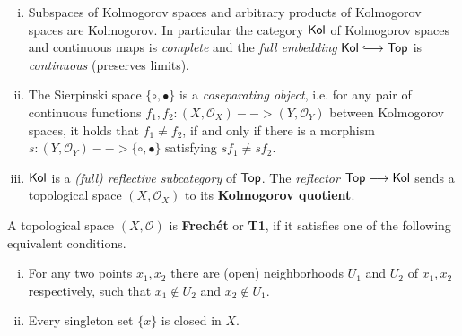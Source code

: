 \begin{lemma}\vspace{-1.5em}
	\begin{enumerate}[(i)]
		\item{
			Subspaces of Kolmogorov spaces and arbitrary products of Kolmogorov spaces are Kolmogorov. In particular the category $\textsf{Kol}$ of Kolmogorov spaces and continuous maps is \textit{complete} and the \textit{full embedding} $\ncat{Kol} \longrightincl \ncat{Top}$ is \textit{continuous} (preserves limits).
		}
		\item{
			The Sierpinski space $\{\circ, \bullet\}$ is a \textit{coseparating object}, i.e. for any pair of continuous functions $f_1,f_2:(X,\mathcal{O}_X) --> (Y,\mathcal{O}_Y)$ between Kolmogorov spaces, it holds that $f_1 \neq f_2$, if and only if there is a morphism $s:(Y,\mathcal{O}_Y) --> \{\circ,\bullet\}$ satisfying $sf_1 \neq sf_2$.
		}
		\item{
			$\textsf{Kol}$ is a \textit{(full) reflective subcategory} of $\textsf{Top}$. The \textit{reflector} $\textsf{Top} --> \textsf{Kol}$ sends a topological space $(X,\mathcal{O}_X)$ to its \textbf{Kolmogorov quotient}.
		}
	\end{enumerate}
\end{lemma}

\begin{definition}
	A topological space $(X, \mathcal{O})$ is \textbf{Frechét} or \textbf{T1}, if it satisfies one of the following equivalent conditions.
	\begin{enumerate}[(i)]
		\item{
			For any two points $x_1,x_2$ there are (open) neighborhoods $U_1$ and $U_2$ of $x_1,x_2$ respectively, such that $x_1 \notin U_2$ and $x_2 \notin U_1$.
		}
		\item{
			Every singleton set $\{x\}$ is closed in $X$.
		}
	\end{enumerate}
\end{definition}

